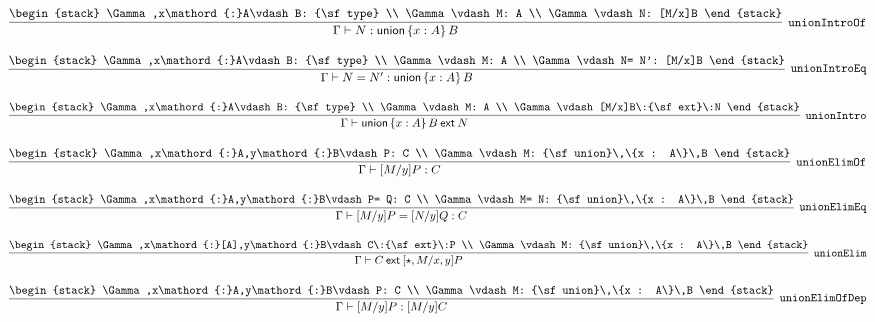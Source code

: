 \[
\infer[{\tt unionIntroOf}]{\Gamma \vdash N: {\sf union}\,\{x : A\}\,B}{
\begin{stack}
\Gamma ,x\mathord{:}A\vdash B: {\sf type}
\\
\Gamma \vdash M: A
\\
\Gamma \vdash N: [M/x]B
\end{stack}}
\]

\[
\infer[{\tt unionIntroEq}]{\Gamma \vdash N= N': {\sf union}\,\{x : A\}\,B}{
\begin{stack}
\Gamma ,x\mathord{:}A\vdash B: {\sf type}
\\
\Gamma \vdash M: A
\\
\Gamma \vdash N= N': [M/x]B
\end{stack}}
\]

\[
\infer[{\tt unionIntro}]{\Gamma \vdash {\sf union}\,\{x : A\}\,B\:{\sf ext}\:N}{
\begin{stack}
\Gamma ,x\mathord{:}A\vdash B: {\sf type}
\\
\Gamma \vdash M: A
\\
\Gamma \vdash [M/x]B\:{\sf ext}\:N
\end{stack}}
\]

\[
\infer[{\tt unionElimOf}]{\Gamma \vdash [M/y]P: C}{
\begin{stack}
\Gamma ,x\mathord{:}A,y\mathord{:}B\vdash P: C
\\
\Gamma \vdash M: {\sf union}\,\{x : A\}\,B
\end{stack}}
\]

\[
\infer[{\tt unionElimEq}]{\Gamma \vdash [M/y]P= [N/y]Q: C}{
\begin{stack}
\Gamma ,x\mathord{:}A,y\mathord{:}B\vdash P= Q: C
\\
\Gamma \vdash M= N: {\sf union}\,\{x : A\}\,B
\end{stack}}
\]

\[
\infer[{\tt unionElim}]{\Gamma \vdash C\:{\sf ext}\:[\star , M/x, y]P}{
\begin{stack}
\Gamma ,x\mathord{:}[A],y\mathord{:}B\vdash C\:{\sf ext}\:P
\\
\Gamma \vdash M: {\sf union}\,\{x : A\}\,B
\end{stack}}
\]

\[
\infer[{\tt unionElimOfDep}]{\Gamma \vdash [M/y]P: [M/y]C}{
\begin{stack}
\Gamma ,x\mathord{:}A,y\mathord{:}B\vdash P: C
\\
\Gamma \vdash M: {\sf union}\,\{x : A\}\,B
\end{stack}}
\]

